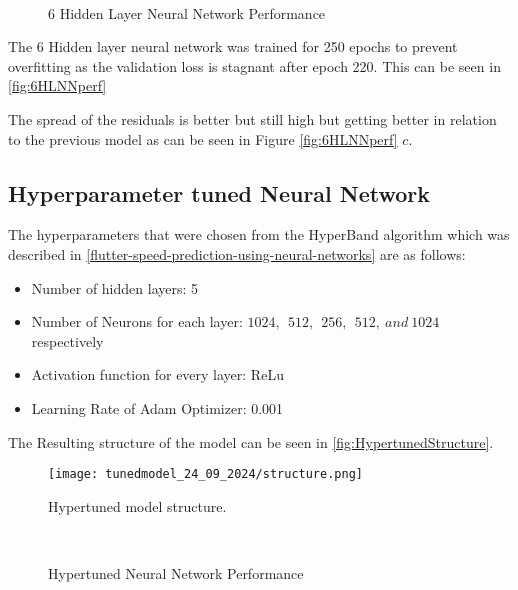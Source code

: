 \begin{figure}[H]
  \centering
   \\
  \subfloat[Residulas]{}

  \caption{6 Hidden Layer Neural Network Performance}
  \label{fig:6HLNNperf}
\end{figure}
The 6 Hidden layer neural network was trained for 250 epochs to prevent overfitting as the validation loss is stagnant after epoch 220. This can be seen in \autoref{fig:6HLNNperf}

The spread of the residuals is better but still high but getting better in relation to the previous model as can be seen in Figure \autoref{fig:6HLNNperf} $c$.

\subsection{Hyperparameter tuned Neural Network}
\label{hyperparameter-tuned-neural-network}

The hyperparameters that were chosen from the HyperBand algorithm which was described in \autoref{flutter-speed-prediction-using-neural-networks} are as follows:

\begin{itemize}
\item
  Number of hidden layers: 5
\item
  Number of Neurons for each layer:
  \(1024,\ \ 512,\ \ 256,\ \ 512,\ and\ 1024\) respectively
\item
  Activation function for every layer: ReLu
\item
  Learning Rate of Adam Optimizer: 0.001
\end{itemize}

The Resulting structure of the model can be seen in \autoref{fig:HypertunedStructure}.

\begin{figure}
  \centering
  \texttt{[image: tunedmodel\_24\_09\_2024/structure.png]} 
  \caption{Hypertuned model structure.}
  \label{fig:HypertunedStructure}
\end{figure}

\begin{figure}[H]
  \centering
   \\
  \subfloat[Residulas]{}

  \caption{Hypertuned Neural Network Performance}
  \label{fig:HypertunedNNperf}
\end{figure}

